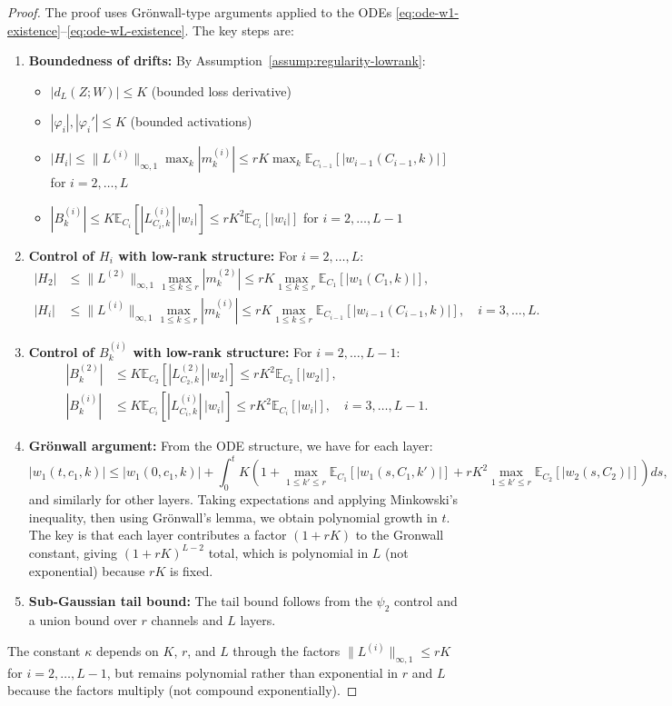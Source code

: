 \documentclass[11pt]{article}
\newcommand{\E}{\mathbb{E}}
\newcommand{\1}{\mathbbm{1}}
\begin{document}
\begin{proof}
The proof uses Grönwall-type arguments applied to the ODEs \eqref{eq:ode-w1-existence}--\eqref{eq:ode-wL-existence}. The key steps are:

\begin{enumerate}
\item \textbf{Boundedness of drifts:} By Assumption~\ref{assump:regularity-lowrank}:
\begin{itemize}
\item $|d_L(Z;W)| \le K$ (bounded loss derivative)
\item $|\varphi_i|, |\varphi_i'| \le K$ (bounded activations)
\item $|H_i| \le \|L^{(i)}\|_{\infty,1}\max_k|m_k^{(i)}|\le rK\max_k\E_{C_{i-1}}[|w_{i-1}(C_{i-1},k)|]$ for $i=2,\ldots,L$
\item $|B_k^{(i)}| \le K\E_{C_i}[|L^{(i)}_{C_i,k}|\,|w_i|]\le rK^2\E_{C_i}[|w_i|]$ for $i=2,\ldots,L-1$
\end{itemize}

\item \textbf{Control of $H_i$ with low-rank structure:} For $i=2,\ldots,L$:
\begin{align*}
|H_2| &\le \|L^{(2)}\|_{\infty,1}\max_{1\le k\le r}|m_k^{(2)}|\le rK\max_{1\le k\le r}\E_{C_1}[|w_1(C_1,k)|],\\
|H_i| &\le \|L^{(i)}\|_{\infty,1}\max_{1\le k\le r}|m_k^{(i)}|\le rK\max_{1\le k\le r}\E_{C_{i-1}}[|w_{i-1}(C_{i-1},k)|], \quad i=3,\ldots,L.
\end{align*}

\item \textbf{Control of $B_k^{(i)}$ with low-rank structure:} For $i=2,\ldots,L-1$:
\begin{align*}
|B_k^{(2)}| &\le K\E_{C_2}[|L^{(2)}_{C_2,k}|\,|w_2|]\le rK^2\E_{C_2}[|w_2|],\\
|B_k^{(i)}| &\le K\E_{C_i}[|L^{(i)}_{C_i,k}|\,|w_i|]\le rK^2\E_{C_i}[|w_i|], \quad i=3,\ldots,L-1.
\end{align*}

\item \textbf{Grönwall argument:} From the ODE structure, we have for each layer:
\[
|w_1(t,c_1,k)| \le |w_1(0,c_1,k)| + \int_0^t K(1 + \max_{1\le k'\le r}\E_{C_1}[|w_1(s,C_1,k')|] + rK^2\max_{1\le k'\le r}\E_{C_2}[|w_2(s,C_2)|]) ds,
\]
and similarly for other layers. Taking expectations and applying Minkowski's inequality, then using Grönwall's lemma, we obtain polynomial growth in $t$. The key is that each layer contributes a factor $(1+rK)$ to the Gronwall constant, giving $(1+rK)^{L-2}$ total, which is polynomial in $L$ (not exponential) because $rK$ is fixed.

\item \textbf{Sub-Gaussian tail bound:} The tail bound follows from the $\psi_2$ control and a union bound over $r$ channels and $L$ layers.
\end{enumerate}

The constant $\kappa$ depends on $K$, $r$, and $L$ through the factors $\|L^{(i)}\|_{\infty,1}\le rK$ for $i=2,\ldots,L-1$, but remains polynomial rather than exponential in $r$ and $L$ because the factors multiply (not compound exponentially).
\end{proof}
\end{document}
